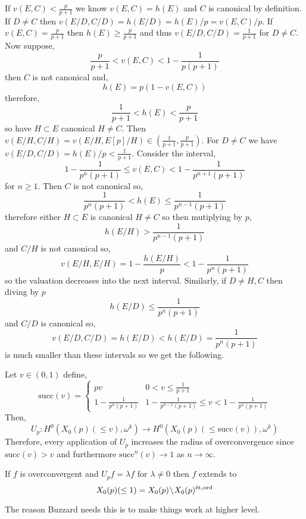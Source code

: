 \documentclass[12pt]{article}
\begin{document}
If $v(E, C) < \frac{p}{p+1}$ we know $v(E, C) = h(E)$ and $C$ is canonical by definition. If $D \neq C$ then $v(E/D, C/D) = h(E/D) = h(E)/p = v(E,C)/p$. If $v(E, C) = \frac{p}{p+1}$ then $h(E) \ge \frac{p}{p+1}$ and thus $v(E/D, C/D) = \frac{1}{p+1}$ for $D \neq C$. 
\bigskip\\
Now suppose,
\[ \frac{p}{p+1} < v(E, C) < 1 - \frac{1}{p(p+1)} \]
then $C$ is not canonical and,
\[ h(E) = p (1 - v(E, C)) \]
therefore,
\[ \frac{1}{p+1} < h(E) < \frac{p}{p+1} \]
so have $H \subset E$ canonical $H \neq C$. Then $v(E/H, C/H) = v(E/H, E[p]/H) \in (\tfrac{1}{p+1}, \tfrac{p}{p+1})$. For $D \neq C$ we have $v(E/D, C/D) = h(E)/p < \frac{1}{p+1}$. Consider the interval,
\[ 1 - \frac{1}{p^n (p+1)} \le v(E, C) < 1 - \frac{1}{p^{n+1}(p+1)} \]
for $n \ge 1$. Then $C$ is not canonical so,
\[ \frac{1}{p^n (p+1)} < h(E) \le \frac{1}{p^{n-1}(p+1)} \]
therefore either $H \subset E$ is canonical $H \neq C$ so then mutiplying by $p$,
\[ h(E/H) > \frac{1}{p^{n-1}(p+1)} \]
and $C/H$ is not canonical so,
\[ v(E/H, E/H) = 1 - \frac{h(E/H)}{p} < 1 - \frac{1}{p^n(p+1)} \]
so the valuation decreases into the next interval. Similarly, if $D \neq H,C$ then diving by $p$
\[ h(E/D) \le \frac{1}{p^{n}(p+1)} \] 
and $C/D$ is canonical so,
\[ v(E/D, C/D) = h(E/D) < h(E/D) = \frac{1}{p^n(p+1)} \]
is much smaller than these intervals so we get the following.

\renewcommand{\succ}{\mathrm{succ}}
\newcommand{\Qbar}{\overline{\Q}}

\begin{prop}
Let $v \in (0, 1)$ define,
\[ \succ(v) = 
\begin{cases}
p v & 0 < v \le \frac{1}{p+1}
\\
1 - \frac{1}{p^n(p+1)} & 1 - \frac{1}{p^{n-1}(p+1)} \le v < 1 - \frac{1}{p^n(p+1)}
\end{cases} \]
Then,
\[ U_p : H^0(X_0(p)(\le v), \omega^k) \to H^0(X_0(p)(\le \succ(v)), \omega^k) \]
Therefore, every application of $U_p$ increases the radius of overconvergence since $\succ(v) > v$ and furthermore $\succ^n(v) \to 1$ as $n \to \infty$. 
\end{prop}

\begin{cor}
If $f$ is overconvergent and $U_p f = \lambda f$ for $\lambda \neq 0$ then $f$ extends to 
\[ X_0(p)(\le 1) = X_0(p) \! \setminus \! X_0(p)^{\text{\'{e}t}, \operatorname{\mathrm{ord}}} \]
\end{cor}

\begin{rmk}
The reason Buzzard needs this is to make things work at higher level.
\end{rmk}
\end{document}
